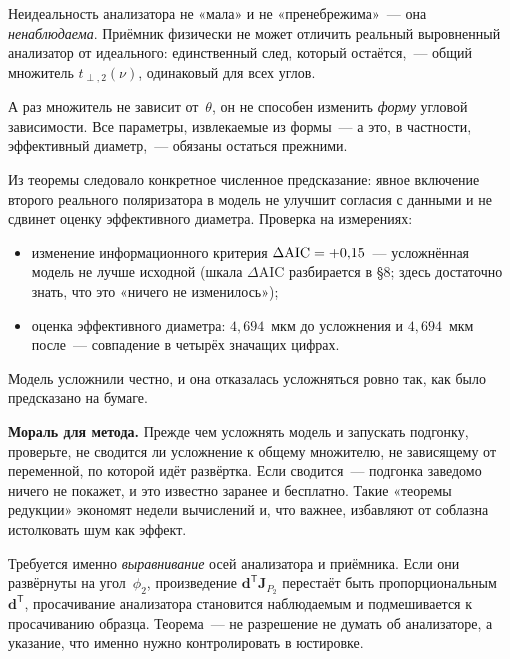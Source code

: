 \begin{intuition}
Неидеальность анализатора не «мала» и не «пренебрежима»~--- она \emph{ненаблюдаема}. Приёмник
физически не может отличить реальный выровненный анализатор от идеального: единственный след,
который остаётся,~--- общий множитель $t_{\perp,2}(\nu)$, одинаковый для всех углов.

А раз множитель не зависит от~$\theta$, он не способен изменить \emph{форму} угловой
зависимости. Все параметры, извлекаемые из формы~--- а это, в частности, эффективный диаметр,~---
обязаны остаться прежними.
\end{intuition}

\begin{example}
Из теоремы следовало конкретное численное предсказание: явное включение второго реального
поляризатора в модель не улучшит согласия с данными и не сдвинет оценку эффективного диаметра.
Проверка на измерениях:

\begin{itemize}[leftmargin=1.4em,itemsep=0.2em]
  \item изменение информационного критерия $\Delta\mathrm{AIC}=+0{,}15$~--- усложнённая модель не лучше
        исходной (шкала $\Delta$AIC разбирается в §8; здесь достаточно знать, что это «ничего не
        изменилось»);
  \item оценка эффективного диаметра: $4{,}694$~мкм до усложнения и $4{,}694$~мкм после~---
        совпадение в четырёх значащих цифрах.
\end{itemize}

Модель усложнили честно, и она отказалась усложняться ровно так, как было предсказано на бумаге.
\end{example}

\begin{tcolorbox}[enhanced,colback=cS1!7,colframe=cS1,boxrule=0pt,leftrule=3pt,arc=1pt]
\textbf{Мораль для метода.} Прежде чем усложнять модель и запускать подгонку, проверьте, не
сводится ли усложнение к общему множителю, не зависящему от переменной, по которой идёт
развёртка. Если сводится~--- подгонка заведомо ничего не покажет, и это известно заранее и
бесплатно. Такие «теоремы редукции» экономят недели вычислений и, что важнее, избавляют от
соблазна истолковать шум как эффект.
\end{tcolorbox}

\begin{warning}
Требуется именно \emph{выравнивание} осей анализатора и приёмника. Если они развёрнуты на
угол~$\phi_2$, произведение $\mathbf{d}^{\mathsf T}\mathbf{J}_{P_2}$ перестаёт быть
пропорциональным $\mathbf{d}^{\mathsf T}$, просачивание анализатора становится наблюдаемым и
подмешивается к просачиванию образца. Теорема~--- не разрешение не думать об анализаторе, а
указание, что именно нужно контролировать в юстировке.
\end{warning}


